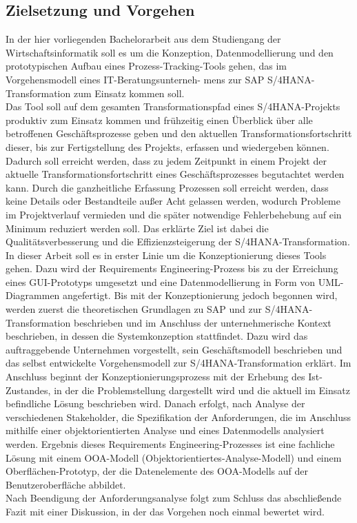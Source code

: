\subsection{Zielsetzung und Vorgehen}
In der hier vorliegenden Bachelorarbeit aus dem Studiengang der Wirtschaftsinformatik soll es um die Konzeption, Datenmodellierung und den prototypischen Aufbau eines Prozess-Tracking-Tools gehen, das im Vorgehensmodell eines IT-Beratungsunterneh- mens zur SAP S/4HANA-Transformation zum Einsatz kommen soll.\\ Das Tool soll auf dem gesamten Transformationspfad eines S/4HANA-Projekts produktiv zum Einsatz kommen und frühzeitig einen Überblick über alle betroffenen Geschäftsprozesse geben und den aktuellen Transformationsfortschritt dieser, bis zur Fertigstellung des Projekts, erfassen und wiedergeben können. Dadurch soll erreicht werden, dass zu jedem Zeitpunkt in einem Projekt der aktuelle Transformationsfortschritt eines Geschäftsprozesses begutachtet werden kann. Durch die ganzheitliche Erfassung Prozessen soll erreicht werden, dass keine Details oder Bestandteile außer Acht gelassen werden, wodurch Probleme im Projektverlauf vermieden und die später notwendige Fehlerbehebung auf ein Minimum reduziert werden soll. Das erklärte Ziel ist dabei die Qualitätsverbesserung und die Effizienzsteigerung der S/4HANA-Transformation.\\
In dieser Arbeit soll es in erster Linie um die Konzeptionierung dieses Tools gehen. Dazu wird der Requirements Engineering-Prozess bis zu der Erreichung eines GUI-Prototyps umgesetzt und eine Datenmodellierung in Form von UML-Diagrammen angefertigt. Bis mit der Konzeptionierung jedoch begonnen wird, werden zuerst die theoretischen Grundlagen zu SAP und zur S/4HANA-Transformation beschrieben und im Anschluss der unternehmerische Kontext beschrieben, in dessen die Systemkonzeption stattfindet. Dazu wird das auftraggebende Unternehmen vorgestellt, sein Geschäftsmodell beschrieben und das selbst entwickelte Vorgehensmodell zur S/4HANA-Transformation erklärt. Im Anschluss beginnt der Konzeptionierungsprozess mit der Erhebung des Ist-Zustandes, in der die Problemstellung dargestellt wird und die aktuell im Einsatz befindliche Lösung beschrieben wird. Danach erfolgt, nach Analyse der verschiedenen Stakeholder, die Spezifikation der Anforderungen, die im Anschluss mithilfe einer objektorientierten Analyse und eines Datenmodells analysiert werden. Ergebnis dieses Requirements Engineering-Prozesses ist eine fachliche Lösung mit einem OOA-Modell (Objektorientiertes-Analyse-Modell) und einem Oberflächen-Prototyp, der die Datenelemente des OOA-Modells auf der Benutzeroberfläche abbildet.\\Nach Beendigung der Anforderungsanalyse folgt zum Schluss das abschließende Fazit mit einer Diskussion, in der das Vorgehen noch einmal bewertet wird. 

